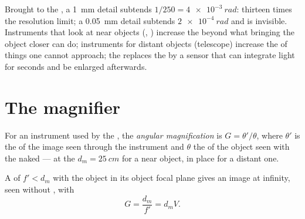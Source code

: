 \begin{remark}\label{rem:b1:optical-instruments:purpose}
Brought to the , a \qty{1}{mm} detail subtends $1/250 =
\qty{4e-3}{rad}$: thirteen times the resolution limit; a \qty{0.05}{mm}
detail subtends $\qty{2e-4}{rad}$ and is invisible. Instruments that
look at near objects (, ) increase the 
beyond what bringing the object closer can do; instruments for distant
objects (telescope) increase the  of things one cannot
approach; the  replaces the  by a sensor that can integrate
light for seconds and be enlarged afterwards.
\end{remark}

\section{The magnifier}

\begin{definition}\label{def:b1:optical-instruments:G}
For an instrument used by the , the \emph{angular magnification} is
$G = \theta'/\theta$, where $\theta'$ is the  of the image
seen through the instrument and $\theta$ the  of the object
seen with the naked  --- at the  $d_m = \qty{25}{cm}$ for
a near object, in place for a distant one.
\end{definition}

\begin{proposition}\label{prop:b1:optical-instruments:loupe}
A  of  $f' < d_m$ with the object in its
object focal plane gives an image at infinity, seen without
, with
\[
G = \frac{d_m}{f'} = d_m V .
\]
\end{proposition}

